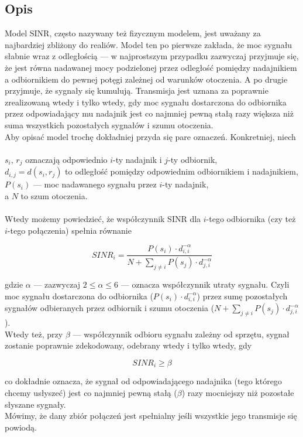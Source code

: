 \documentclass[11pt,a4paper,onecolumn,twoside]{mwart}
\begin{document}
\subsection{Opis}
Model SINR, często nazywany też fizycznym modelem, jest uważany za najbardziej
zbliżony do realiów. Model ten po pierwsze zakłada, że moc sygnału słabnie
wraz z odległością --- w najprostszym przypadku zazwyczaj przyjmuje się, że jest
równa nadawanej mocy podzielonej przez odległość pomiędzy nadajnikiem
a odbiornikiem do pewnej potęgi zależnej od warunków otoczenia. A po drugie
przyjmuje, że sygnały się kumulują. Transmisja jest uznana za poprawnie
zrealizowaną wtedy i tylko wtedy, gdy moc sygnału dostarczona do odbiornika
przez odpowiadający mu nadajnik jest co najmniej pewną stałą razy większa niż
suma wszystkich pozostałych sygnałów i szumu otoczenia. \\
Aby opisać model trochę dokładniej przyda się pare oznaczeń. Konkretniej,
niech \\
\\
\indent $s_i$, $r_j$ oznaczają odpowiednio $i$-ty nadajnik i $j$-ty odbiornik,\\
\indent $d_{i,j} = d(s_i, r_j)$ to odległość pomiędzy odpowiednim odbiornikiem
i nadajnikiem, \\
\indent $P(s_i)$ --- moc nadawanego sygnału przez $i$-ty nadajnik,\\
\indent a $N$ to szum otoczenia. \\
\\
Wtedy możemy powiedzieć, że współczynnik SINR dla $i$-tego odbiornika (czy też
$i$-tego połączenia) spełnia równanie

$$
SINR_i = \frac{P(s_i) \cdot d_{i,i}^{-\alpha}}{N + \sum_{j \neq i} P(s_j)
       \cdot d_{j, i}^{-\alpha}}
$$

gdzie $\alpha$ --- zazwyczaj $2 \le \alpha \leq 6$ --- oznacza współczynnik
utraty sygnału. Czyli moc sygnału dostarczona do odbiornika
($P(s_i) \cdot d_{i,i}^{-\alpha}$) przez sumę pozostałych sygnałów
odbieranych przez odbiornik i szumu otoczenia ($N + \sum_{j \neq i} P(s_j) \cdot
d_{j, i}^{-\alpha}$). \\
Wtedy też, przy $\beta$ --- współczynnik odbioru sygnału zależny od sprzętu,
sygnał zostanie poprawnie zdekodowany, odebrany wtedy i tylko wtedy, gdy

$$
    SINR_i \geq \beta
$$

co dokładnie oznacza, że sygnał od odpowiadającego nadajnika (tego którego
chcemy usłyszeć) jest co najmniej pewną stałą ($\beta$) razy mocniejszy niż
pozostałe słyszane sygnały. \\
Mówimy, że dany zbiór połączeń jest spełnialny jeśli wszystkie jego transmisje
się powiodą.
\end{document}
